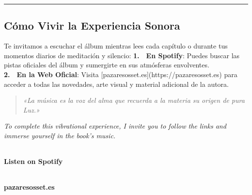 \vspace{0.4cm}
\begin{center}
\rule{0.35\textwidth}{0.4pt}
\end{center}
\vspace{0.4cm}


\subsection*{Cómo Vivir la Experiencia Sonora}
Te invitamos a escuchar el álbum mientras lees cada capítulo o durante tus momentos diarios de meditación y silencio:
\noindent\textbf{1.}~~\textbf{En Spotify}: Puedes buscar las pistas oficiales del álbum y sumergirte en sus atmósferas envolventes.\\

\noindent\textbf{2.}~~\textbf{En la Web Oficial}: Visita [pazaresosset.es](https://pazaresosset.es) para acceder a todas las novedades, arte visual y material adicional de la autora.\\




\begin{quote}
\itshape \textit{«La música es la voz del alma que recuerda a la materia su origen de pura Luz.»}
\end{quote}

\vspace{1.5cm}
\begin{center}
\textit{To complete this vibrational experience, I invite you to follow the links and immerse yourself in the book's music.}\\
\vspace{1cm}
\begin{minipage}{0.45\textwidth}
\centering
{}\\
\vspace{0.4cm}\textbf{Listen on Spotify}
\end{minipage}\hfill
\begin{minipage}{0.45\textwidth}
\centering
{}\\
\vspace{0.4cm}\textbf{pazaresosset.es}
\end{minipage}
\end{center}